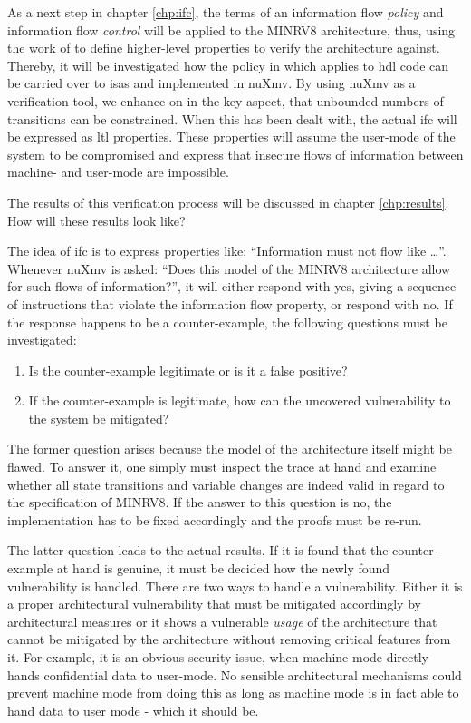 As a next step in chapter \ref{chp:ifc}, the terms of an information flow \textit{policy} and information flow \textit{control} will be applied to the MINRV8 architecture, thus, using the work of \citeauthor{Ferraiuolo17} \cite{Ferraiuolo17} to define higher-level properties to verify the architecture against.
Thereby, it will be investigated how the policy in \cite{Ferraiuolo17} which applies to \gls{hdl} code can be carried over to \glspl{isa} and implemented in nuXmv.
By using nuXmv as a verification tool, we enhance on \cite{Reid17} in the key aspect, that unbounded numbers of transitions can be constrained.
When this has been dealt with, the actual \gls{ifc} will be expressed as \gls{ltl} properties.
These properties will assume the user-mode of the system to be compromised and express that insecure flows of information between machine- and user-mode are impossible.

The results of this verification process will be discussed in chapter \ref{chp:results}.
How will these results look like?

The idea of \gls{ifc} is to express properties like: \enquote{Information must not flow like \dots}.
Whenever nuXmv is asked: \enquote{Does this model of the MINRV8 architecture allow for such flows of information?}, it will either respond with yes, giving a sequence of instructions that violate the information flow property, or respond with no.
If the response happens to be a counter-example, the following questions must be investigated:
\begin{enumerate}
    \item \label{itm:counter-ex-validity}
    Is the counter-example legitimate or is it a false positive?
    \item \label{itm:counter-ex-mitigation}
    If the counter-example is legitimate, how can the uncovered vulnerability to the system be mitigated?
\end{enumerate}

The former question arises because the model of the architecture itself might be flawed.
To answer it, one simply must inspect the trace at hand and examine whether all state transitions and variable changes are indeed valid in regard to the specification of MINRV8.
If the answer to this question is no, the implementation has to be fixed accordingly and the proofs must be re-run.

The latter question leads to the actual results.
If it is found that the counter-example at hand is genuine, it must be decided how the newly found vulnerability is handled.
There are two ways to handle a vulnerability.
Either it is a proper architectural vulnerability that must be mitigated accordingly by architectural measures or it shows a vulnerable \textit{usage} of the architecture that cannot be mitigated by the architecture without removing critical features from it.
For example, it is an obvious security issue, when machine-mode directly hands confidential data to user-mode.
No sensible architectural mechanisms could prevent machine mode from doing this as long as machine mode is in fact able to hand data to user mode - which it should be.

